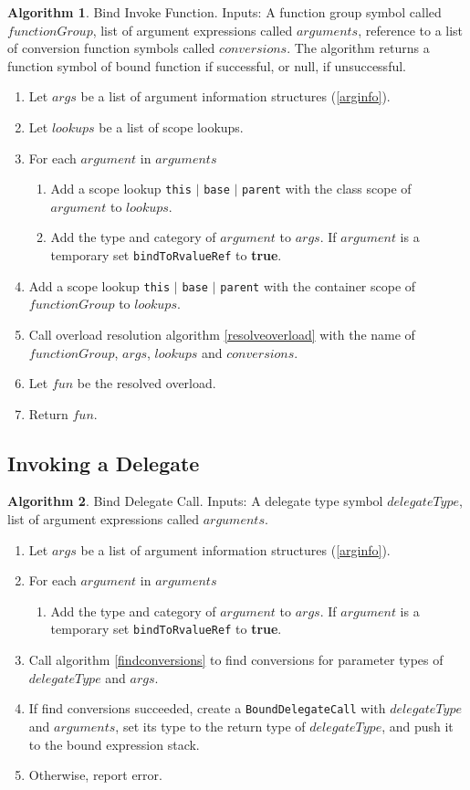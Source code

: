 \documentclass[a4paper,oneside,11pt]{book}
\theoremstyle{definition}
\newtheorem{algo}{Algorithm}[section]
\begin{document}
\begin{algo}\label{bindinvokefun} Bind Invoke Function.
Inputs: A function group symbol called $functionGroup$, list of argument expressions called $arguments$,
reference to a list of conversion function symbols called $conversions$.
The algorithm returns a function symbol of bound function if successful, or null, if unsuccessful.
\begin{enumerate}
\item
Let $args$ be a list of argument information structures (\ref{arginfo}).
\item
Let $lookups$ be a list of scope lookups.
\item
For each $argument$ in $arguments$
\begin{enumerate}
\item
Add a scope lookup \verb|this| $|$ \verb|base| $|$ \verb|parent| with the class scope of $argument$ to $lookups$.
\item
Add the type and category of $argument$ to $args$. If $argument$ is a temporary set \verb|bindToRvalueRef| to \textbf{true}.
\end{enumerate}
\item
Add a scope lookup \verb|this| $|$ \verb|base| $|$ \verb|parent| with the container scope of $functionGroup$ to $lookups$.
\item
Call overload resolution algorithm \ref{resolveoverload} with the name of $functionGroup$, $args$, $lookups$ and $conversions$.
\item
Let $fun$ be the resolved overload.
\item
Return $fun$.
\end{enumerate}
\end{algo}

\subsection{Invoking a Delegate}

\begin{algo}\label{bindinvokedelegate} Bind Delegate Call.
Inputs: A delegate type symbol $delegateType$, list of argument expressions called $arguments$.
\begin{enumerate}
\item
Let $args$ be a list of argument information structures (\ref{arginfo}).
\item
For each $argument$ in $arguments$
\begin{enumerate}
\item
Add the type and category of $argument$ to $args$. If $argument$ is a temporary set \verb|bindToRvalueRef| to \textbf{true}.
\end{enumerate}
\item
Call algorithm \ref{findconversions} to find conversions for parameter types of $delegateType$ and $args$.
\item
If find conversions succeeded, create a \verb|BoundDelegateCall| with $delegateType$ and $arguments$, set its type to the return type of $delegateType$,
and push it to the bound expression stack.
\item
Otherwise, report error.
\end{enumerate}
\end{algo}
\end{document}
